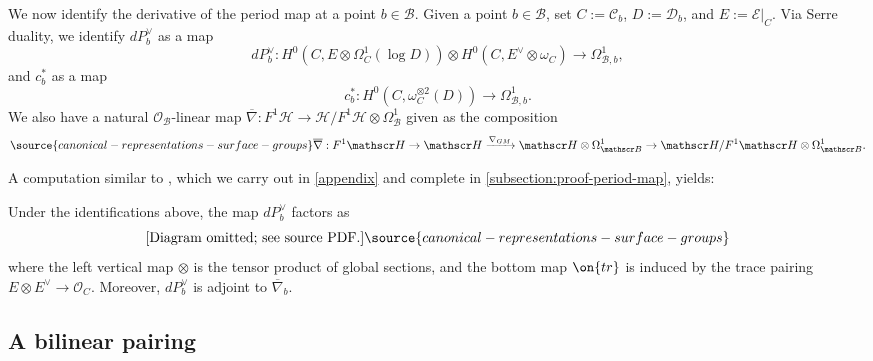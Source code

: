 We now identify the derivative of the period map at a point $b \in \mathscr B$.
Given a point $b\in \mathscr{B}$, set $C:=\mathscr{C}_b$,
$D:=\mathscr{D}_b$, and $E:=\mathscr{E}|_C$. Via Serre duality, we identify $dP^\vee_b$ as a map $$dP^\vee_b: H^0(C, {E}\otimes \Omega^1_C(\log D))\otimes H^0(C, {E}^\vee \otimes \omega_C)\to \Omega^1_{\mathscr{B},b},$$ and $c^*_b$ as a map $$c^*_b: H^0(C, \omega_C^{\otimes 2}(D))\to \Omega^1_{\mathscr{B}, b}.$$
We also have a natural $\mathscr{O}_\mathscr{B}$-linear map $\overline{\nabla}: F^1 \mathscr H \to \mathscr H/F^1 \mathscr H \otimes
\Omega^1_{\mathscr B}$ given as the composition
\begin{align}
	\label{equation:shift-derivative}
\source{canonical-representations-surface-groups}
	\overline{\nabla}: F^1 \mathscr H \to \mathscr H \xrightarrow{\nabla_{GM}} \mathscr H \otimes
	\Omega^1_{\mathscr B} \to \mathscr H/F^1 \mathscr H \otimes
	\Omega^1_{\mathscr B}.
\end{align}

A computation similar to
\cite[Lemma 10.19, Theorem 10.21, and Lemma 10.22]{Voisin:hodgeTheory},
which we carry out in
\autoref{appendix} and complete in
\autoref{subsection:proof-period-map},
yields:
\begin{theorem}
\notready\label{theorem:period-map-computation}
	Under the identifications above, the map $dP^\vee_b$ factors as
	\begin{equation}
	\text{[Diagram omitted; see source PDF.]}
		\label{equation:multiplication-to-period}
\source{canonical-representations-surface-groups}
	\end{equation}
where the left vertical map $\otimes$ is the tensor product of global sections, and the bottom map $\on{tr}$ is induced by the trace pairing ${E}\otimes {E}^\vee\to \mathscr{O}_C$.
	Moreover, $dP^\vee_b$ is adjoint to $\overline \nabla_b$.
\end{theorem}

\subsection{A bilinear pairing}\label{subsection:bilinear-pairing}


